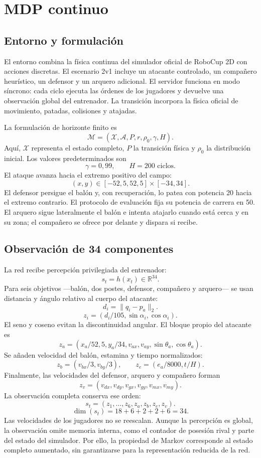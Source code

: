 \section{MDP continuo}

\subsection{Entorno y formulación}
El entorno combina la física continua del simulador oficial de RoboCup 2D
\cite{noda1998} con acciones discretas. El escenario 2v1 incluye un atacante
controlado, un compañero heurístico, un defensor y un arquero adicional.
El servidor funciona en modo síncrono: cada ciclo ejecuta las órdenes de los
jugadores y devuelve una observación global del entrenador. La transición
incorpora la física oficial de movimiento, patadas, colisiones y atajadas.

La formulación de horizonte finito es
\[
    \mathcal{M}=(\mathcal{X},\mathcal{A},P,r,\rho_0,\gamma,H).
\]
Aquí, $\mathcal{X}$ representa el estado completo, $P$ la transición física y
$\rho_0$ la distribución inicial. Los valores predeterminados son
\[
    \gamma=0{,}99,\qquad H=200\text{ ciclos}.
\]
El ataque avanza hacia el extremo positivo del campo:
\[
    (x,y)\in[-52{,}5,52{,}5]\times[-34,34].
\]
El defensor persigue el balón y, con recuperación, lo patea con potencia 20
hacia el extremo contrario. El protocolo de evaluación fija su potencia de
carrera en 50. El arquero sigue lateralmente el balón e intenta atajarlo cuando
está cerca y en su zona; el compañero se ofrece por delante y dispara si recibe.

\subsection{Observación de 34 componentes}
La red recibe percepción privilegiada del entrenador:
\[
    s_t=h(x_t)\in\mathbb{R}^{34}.
\]
Para seis objetivos ---balón, dos postes, defensor, compañero y arquero--- se
usan distancia y ángulo relativo al cuerpo del atacante:
\[
    d_i=\lVert q_i-p_a\rVert_2.
\]
\[
    z_i=(d_i/105,\sin\alpha_i,\cos\alpha_i).
\]
El seno y coseno evitan la discontinuidad angular. El bloque propio del atacante es
\[
    z_a=(x_a/52{,}5,y_a/34,v_{ax},v_{ay},\sin\theta_a,\cos\theta_a).
\]
Se añaden velocidad del balón, estamina y tiempo normalizados:
\[
    z_b=(v_{bx}/3,v_{by}/3),\qquad z_e=(e_a/8000,t/H).
\]
Finalmente, las velocidades del defensor, arquero y compañero forman
\[
    z_v=(v_{dx},v_{dy},v_{gx},v_{gy},v_{mx},v_{my}).
\]
La observación completa conserva ese orden:
\[
    s_t=(z_1,\ldots,z_6,z_a,z_b,z_e,z_v).
\]
\[
    \dim(s_t)=18+6+2+2+6=34.
\]
Las velocidades de los jugadores no se reescalan. Aunque la percepción es global,
la observación omite memoria interna, como el contador de posesión rival y parte
del estado del simulador. Por ello, la propiedad de Markov corresponde al estado
completo aumentado, sin garantizarse para la representación reducida de la red.

